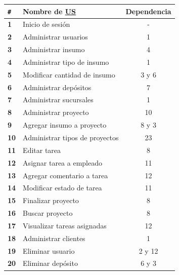 \documentclass[a4paper, 12pt,twoside]{report}  %
\numberwithin{equation}{subsection} %
\begin{document}
\begin{table}[h!]
	\centering
	\begin{tabular}{ |p{0.5cm}|p{9cm}|c|  }
		\hline
		\verb|#|& \textbf{Nombre de \hyperlink{US}{US}}& \textbf{Dependencia} \\
		\hline
		\textbf{1} & \cellcolor{marca_US_realizada_anterior}Inicio de sesión & - \\
		\hline
		\textbf{2} & \cellcolor{marca_US_realizada_anterior}Administrar usuarios & 1 \\
		\hline
		\textbf{3} & \cellcolor{marca_US_realizada_anterior}Administrar insumo & 4 \\
		\hline
		\textbf{4} & \cellcolor{marca_US_realizada_anterior}Administrar tipo de insumo & 1 \\
		\hline
		\textbf{5} & \cellcolor{marca_US_realizada_anterior}Modificar cantidad de insumo & 3 y 6 \\
		\hline
		\textbf{6} & \cellcolor{marca_US_realizada_anterior}Administrar depósitos & 7 \\
		\hline
		\textbf{7} & \cellcolor{marca_US_realizada_anterior}Administrar sucursales & 1 \\
		\hline
		\textbf{8} & \cellcolor{marca_US_realizada}Administrar proyecto & 10 \\
		\hline
		\textbf{9} & Agregar insumo a proyecto & 8 y 3 \\
		\hline
		\textbf{10} & \cellcolor{marca_US_realizada}Administrar tipos de proyectos & 23 \\
		\hline
		\textbf{11} & Editar tarea & 8 \\
		\hline
		\textbf{12} & \cellcolor{marca_US_realizada}Asignar tarea a empleado & 11\\
		\hline
		\textbf{13} & Agregar comentario a tarea & 12 \\
		\hline
		\textbf{14} & Modificar estado de tarea & 11 \\
		\hline
		\textbf{15} & Finalizar proyecto & 8 \\
		\hline
		\textbf{16} & \cellcolor{marca_US_realizada}Buscar proyecto & 8 \\
		\hline
		\textbf{17} & \cellcolor{marca_US_realizada}Visualizar tareas asignadas & 12 \\
		\hline
		\textbf{18} & \cellcolor{marca_US_realizada_anterior}Administrar clientes & 1 \\
		\hline
		\textbf{19} & Eliminar usuario & 2 y 12 \\
		\hline
		\textbf{20} & Eliminar depósito & 6 y 3 \\

\end{tabular}
\end{table}
\end{document}
